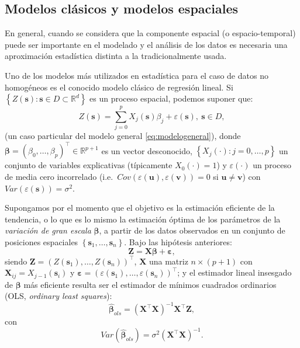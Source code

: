 \documentclass[
  spanish,
]{book}
\theoremstyle{break}
\theoremstyle{definition}
\theoremstyle{definition}
\theoremstyle{definition}
\theoremstyle{definition}
\theoremstyle{remark}
\begin{document}
\hypertarget{modelos-clasicos-espaciales}{%
\subsection{Modelos clásicos y modelos espaciales}\label{modelos-clasicos-espaciales}}

En general, cuando se considera que la componente espacial (o espacio-temporal) puede ser importante en el modelado y el análisis de los datos es necesaria una aproximación estadística distinta a la tradicionalmente usada.

Uno de los modelos más utilizados en estadística para el caso de datos no homogéneos es el conocido modelo clásico de regresión lineal.
Si \(\left\{ Z(\mathbf{s}):\mathbf{s}\in D\subset \mathbb{R}^{d} \right\}\) es un proceso espacial, podemos suponer que:
\begin{equation}
  Z(\mathbf{s})=\sum\limits_{j=0}^{p}X_{j}(\mathbf{s})\beta_{j} +\varepsilon(\mathbf{s}),\ \mathbf{s}\in D,
  \label{eq:modelolineal}
\end{equation}
(un caso particular del modelo general \eqref{eq:modelogeneral}), donde \(\boldsymbol{\beta }=(\beta_{0}, \ldots,\beta_{p})^{\top}\in \mathbb{R}^{p+1}\) es un vector desconocido, \(\left\{ X_{j} (\cdot):j=0, \ldots,p\right\}\) un conjunto de variables explicativas (típicamente \(X_0(\cdot)=1\)) y \(\varepsilon(\cdot)\) un proceso de media cero incorrelado (i.e.~\(Cov(\varepsilon (\mathbf{u}),\varepsilon (\mathbf{v}))=0\) si \(\mathbf{u}\neq \mathbf{v}\)) con \(Var(\varepsilon (\mathbf{s}))=\sigma^{2}\).

Supongamos por el momento que el objetivo es la estimación eficiente de la tendencia, o lo que es lo mismo la estimación óptima de los parámetros de la \emph{variación de gran escala} \(\boldsymbol{\beta}\), a partir de los datos observados en un conjunto de posiciones espaciales \(\left\{ \mathbf{s}_{1}, \ldots,\mathbf{s}_{n} \right\}\).
Bajo las hipótesis anteriores:
\[\mathbf{Z} = \mathbf{X}\boldsymbol{\beta} + \boldsymbol{\varepsilon},\]
siendo \(\mathbf{Z}=\left( Z(\mathbf{s}_{1}), \ldots,Z(\mathbf{s}_{n}) \right)^{\top}\), \(\mathbf{X}\) una matriz \(n\times (p+1)\) con \(\mathbf{X}_{ij}=X_{j-1}(\mathbf{s}_{i})\) y \(\boldsymbol{\varepsilon} = \left( \varepsilon (\mathbf{s}_{1}), \ldots,\varepsilon (\mathbf{s}_{n})\right)^{\top}\); y el estimador lineal insesgado de \(\boldsymbol{\beta}\) más eficiente resulta ser el estimador de mínimos cuadrados ordinarios (OLS, \emph{ordinary least squares}):
\begin{equation} 
  \hat{\boldsymbol{\beta}}_{ols}=(\mathbf{X}^{\top}\mathbf{X})^{-1}\mathbf{X}^{\top}\mathbf{Z},
  \label{eq:beta-ols}
\end{equation}
con \[Var(\hat{\boldsymbol{\beta}}_{ols})=\sigma^{2}(\mathbf{X}^{\top}\mathbf{X})^{-1}.\]
\end{document}
